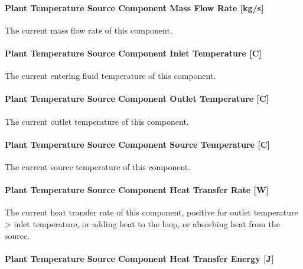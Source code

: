 \paragraph{Plant Temperature Source Component Mass Flow Rate {[}kg/s{]}}\label{plant-temperature-source-component-mass-flow-rate-kgs}

The current mass flow rate of this component.

\paragraph{Plant Temperature Source Component Inlet Temperature {[}C{]}}\label{plant-temperature-source-component-inlet-temperature-c}

The current entering fluid temperature of this component.

\paragraph{Plant Temperature Source Component Outlet Temperature {[}C{]}}\label{plant-temperature-source-component-outlet-temperature-c}

The current outlet temperature of this component.

\paragraph{Plant Temperature Source Component Source Temperature {[}C{]}}\label{plant-temperature-source-component-source-temperature-c}

The current source temperature of this component.

\paragraph{Plant Temperature Source Component Heat Transfer Rate {[}W{]}}\label{plant-temperature-source-component-heat-transfer-rate-w}

The current heat transfer rate of this component, positive for outlet temperature \textgreater{} inlet temperature, or adding heat to the loop, or absorbing heat from the source.

\paragraph{Plant Temperature Source Component Heat Transfer Energy {[}J{]}}\label{plant-temperature-source-component-heat-transfer-energy-j}

